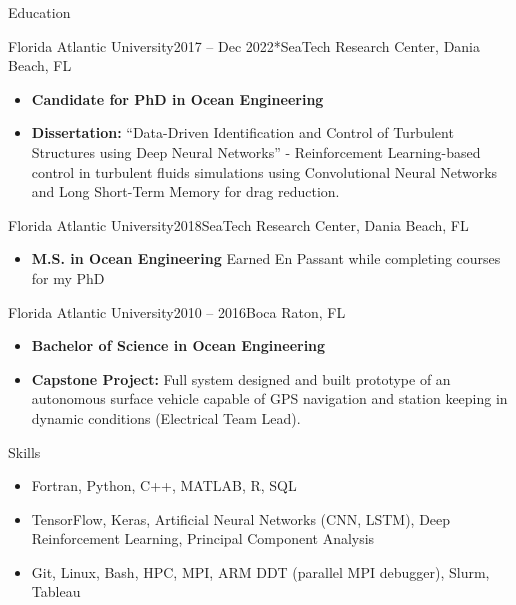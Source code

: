 \documentclass[]{mcdowellcv}
\begin{document}
	\makeheader
	

\begin{cvsection}{Education}
		\begin{cvsubsection}{Florida Atlantic University}{}{2017 -- Dec 2022*}{SeaTech Research Center, Dania Beach, FL}
			\begin{itemize}
				\item \textbf{Candidate for PhD in Ocean Engineering}
				\item \textbf{Dissertation:} ``Data-Driven Identification and Control of Turbulent Structures using Deep Neural Networks'' - Reinforcement Learning-based control in turbulent fluids simulations using Convolutional Neural Networks and Long Short-Term Memory for drag reduction.
			\end{itemize}
		\end{cvsubsection}
		\begin{cvsubsection}{Florida Atlantic University}{}{2018}{SeaTech Research Center, Dania Beach, FL}
			\begin{itemize}
				\item \textbf{M.S. in Ocean Engineering} Earned En Passant while completing courses for my PhD
			\end{itemize}
		\end{cvsubsection}				
		\begin{cvsubsection}{Florida Atlantic University}{}{2010 -- 2016}{Boca Raton, FL}
			\begin{itemize}
				\item \textbf{Bachelor of Science in Ocean Engineering}
				\item \textbf{Capstone Project:} Full system designed and built prototype of an autonomous surface vehicle capable of GPS navigation and station keeping in dynamic conditions (Electrical Team Lead).
			\end{itemize}
		\end{cvsubsection}
	\end{cvsection}
	
			\begin{cvsection}{Skills}
		\begin{cvsubsection}{}{}{}	
			\begin{itemize}
				\item Fortran, Python, C++, MATLAB, R, SQL
				\item TensorFlow, Keras, Artificial Neural Networks (CNN, LSTM), Deep Reinforcement Learning, Principal Component Analysis
				\item Git, Linux, Bash, HPC, MPI, ARM DDT (parallel MPI debugger), Slurm, Tableau
			\end{itemize}
		\end{cvsubsection}
	\end{cvsection}
	
\end{document}
